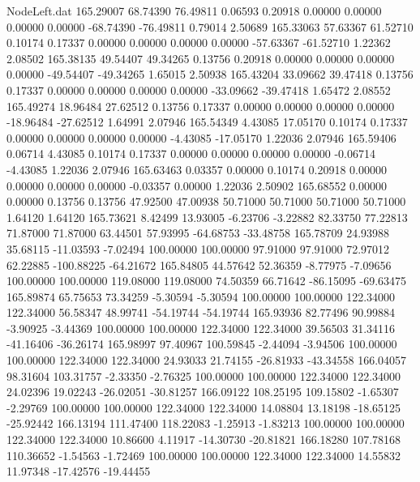 \begin{filecontents}{NodeLeft.dat}
 165.29007   68.74390   76.49811     0.06593    0.20918    0.00000    0.00000    0.00000    0.00000  -68.74390  -76.49811    0.79014    2.50689
 165.33063   57.63367   61.52710     0.10174    0.17337    0.00000    0.00000    0.00000    0.00000  -57.63367  -61.52710    1.22362    2.08502
 165.38135   49.54407   49.34265     0.13756    0.20918    0.00000    0.00000    0.00000    0.00000  -49.54407  -49.34265    1.65015    2.50938
 165.43204   33.09662   39.47418     0.13756    0.17337    0.00000    0.00000    0.00000    0.00000  -33.09662  -39.47418    1.65472    2.08552
 165.49274   18.96484   27.62512     0.13756    0.17337    0.00000    0.00000    0.00000    0.00000  -18.96484  -27.62512    1.64991    2.07946
 165.54349    4.43085   17.05170     0.10174    0.17337    0.00000    0.00000    0.00000    0.00000   -4.43085  -17.05170    1.22036    2.07946
 165.59406    0.06714    4.43085     0.10174    0.17337    0.00000    0.00000    0.00000    0.00000   -0.06714   -4.43085    1.22036    2.07946
 165.63463    0.03357    0.00000     0.10174    0.20918    0.00000    0.00000    0.00000    0.00000   -0.03357    0.00000    1.22036    2.50902
 165.68552    0.00000    0.00000     0.13756    0.13756   47.92500   47.00938   50.71000   50.71000   50.71000   50.71000    1.64120    1.64120
 165.73621    8.42499   13.93005    -6.23706   -3.22882   82.33750   77.22813   71.87000   71.87000   63.44501   57.93995  -64.68753  -33.48758
 165.78709   24.93988   35.68115   -11.03593   -7.02494  100.00000  100.00000   97.91000   97.91000   72.97012   62.22885 -100.88225  -64.21672
 165.84805   44.57642   52.36359    -8.77975   -7.09656  100.00000  100.00000  119.08000  119.08000   74.50359   66.71642  -86.15095  -69.63475
 165.89874   65.75653   73.34259    -5.30594   -5.30594  100.00000  100.00000  122.34000  122.34000   56.58347   48.99741  -54.19744  -54.19744
 165.93936   82.77496   90.99884    -3.90925   -3.44369  100.00000  100.00000  122.34000  122.34000   39.56503   31.34116  -41.16406  -36.26174
 165.98997   97.40967  100.59845    -2.44094   -3.94506  100.00000  100.00000  122.34000  122.34000   24.93033   21.74155  -26.81933  -43.34558
 166.04057   98.31604  103.31757    -2.33350   -2.76325  100.00000  100.00000  122.34000  122.34000   24.02396   19.02243  -26.02051  -30.81257
 166.09122  108.25195  109.15802    -1.65307   -2.29769  100.00000  100.00000  122.34000  122.34000   14.08804   13.18198  -18.65125  -25.92442
 166.13194  111.47400  118.22083    -1.25913   -1.83213  100.00000  100.00000  122.34000  122.34000   10.86600    4.11917  -14.30730  -20.81821
 166.18280  107.78168  110.36652    -1.54563   -1.72469  100.00000  100.00000  122.34000  122.34000   14.55832   11.97348  -17.42576  -19.44455

\end{filecontents}
